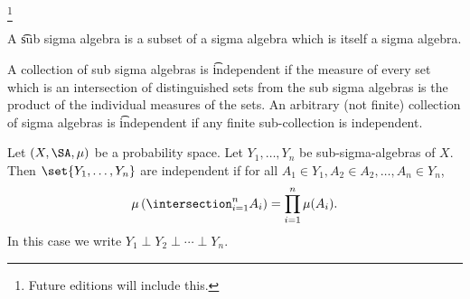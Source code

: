 

\footnote{Future editions will include this.}


A \t{sub sigma algebra} is a subset of a sigma algebra which is itself a sigma algebra.

A collection of sub sigma algebras is \t{independent} if the measure
of every set which is an intersection of distinguished sets from the sub sigma algebras is the product of the individual measures of the sets.
An arbitrary (not finite) collection of sigma algebras is \t{independent}
if any finite sub-collection is independent.


Let $(X, \SA, \mu)$ be a probability
space.
Let $Y_1, \dots, Y_n$ be
sub-sigma-algebras of $X$.
Then $\set{Y_1, \dots, Y_n}$
are independent if for all
$A_1 \in Y_1, A_2 \in A_2, \dots, A_n \in Y_n$,
\[
  \mu\left(\intersection_{i = 1}^{n}A_i\right) = \prod_{i = 1}^{n} \mu(A_i).
\]
In this case we write $Y_1 \perp Y_2 \perp \cdots \perp Y_n$.

\blankpage
